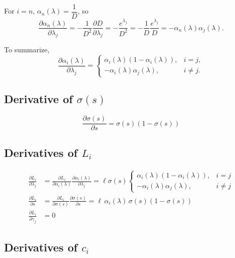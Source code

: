 For $i = n$, $\alpha_n(\lambda) = \dfrac{1}{D}$, so
\begin{equation*}
\frac{\partial \alpha_n(\lambda)}{\partial \lambda_j}
=
-\frac{1}{D^2} \frac{\partial D}{\partial \lambda_j}
=
-\frac{e^{\lambda_j}}{D^2}
=
-\frac{1}{D}\frac{e^{\lambda_j}}{D}
=
-\alpha_n(\lambda) \alpha_j(\lambda).
\end{equation*}

To summarize,
\begin{equation*}
\frac{\partial \alpha_i(\lambda)}{\partial \lambda_j}
=
\begin{cases}
\alpha_i(\lambda)(1-\alpha_i(\lambda)), & i=j,\\[6pt]
-\alpha_i(\lambda) \alpha_j(\lambda), & i\neq j.
\end{cases}
\end{equation*}

\subsection*{Derivative of $\sigma(s)$}

\begin{equation*}
\frac{\partial \sigma(s)}{\partial s}
=
\sigma(s)(1-\sigma(s))
\end{equation*}

\subsection*{Derivatives of $L_i$}

\begin{align*}
\frac{\partial L_i}{\partial \lambda_j}
&=
\frac{\partial L_i}{\partial \alpha_i(\lambda)} \frac{\partial \alpha_i(\lambda)}{\partial \lambda_j} =
\ell \sigma(s)
\begin{cases}
\alpha_i(\lambda)(1-\alpha_i(\lambda)), & i=j\\[4pt]
-\alpha_i(\lambda) \alpha_j(\lambda), & i\neq j
\end{cases}
\\[6pt]
\frac{\partial L_i}{\partial s}
&=
\frac{\partial L_i}{\partial \sigma(s)} \frac{\partial \sigma(s)}{\partial s} =
\ell\,\alpha_i(\lambda)\,\sigma(s)(1-\sigma(s))
\\[6pt]
\frac{\partial L_i}{\partial \gamma_j}
&=0
\end{align*}

\subsection*{Derivatives of $c_i$}

